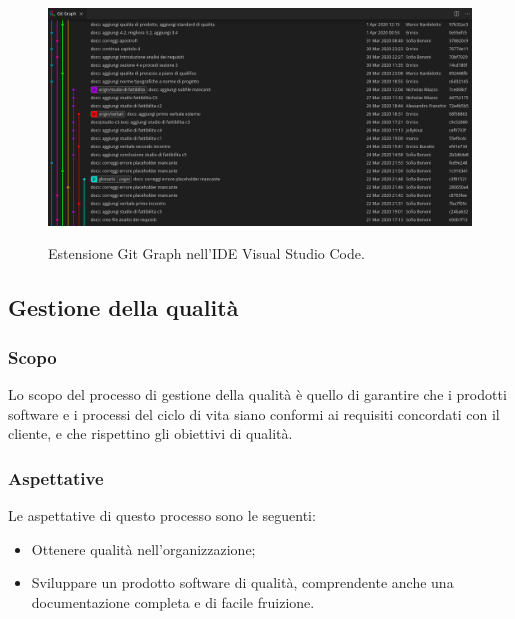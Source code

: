 \documentclass[../norme-di-progetto.tex]{subfiles}
\begin{document}
\begin{figure}[H]
  \centering
  \includegraphics[width=15cm]{img/gitgraph.png}
  \label{fig:github}
  \caption{Estensione Git Graph nell'IDE Visual Studio Code.}
\end{figure}

\subsection{Gestione della qualità}
\subsubsection{Scopo}
Lo scopo del processo di gestione della qualità è quello di garantire che i prodotti software e i processi del ciclo di vita siano conformi ai requisiti concordati con il cliente, e che rispettino gli obiettivi di qualità.
\subsubsection{Aspettative}
Le aspettative di questo processo sono le seguenti:
\begin{itemize}
  \item Ottenere qualità nell'organizzazione;
  \item Sviluppare un prodotto software di qualità, comprendente anche una documentazione completa e di facile fruizione.
\end{itemize}
\end{document}
